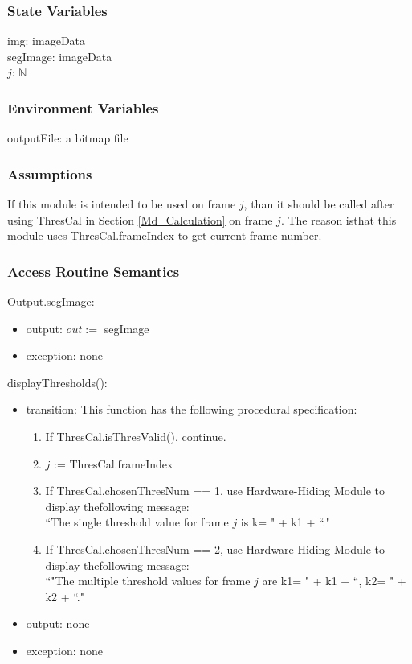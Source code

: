 \documentclass[12pt, titlepage]{article}
\begin{document}
\subsubsection{State Variables}

img: imageData\\
segImage: imageData\\
$j$: $\mathbb{N}$

\subsubsection{Environment Variables}

outputFile: a bitmap file

\subsubsection{Assumptions}

If this module is intended to be used on frame $j$, than it should be called
after using ThresCal in Section \ref{Md_Calculation} on frame $j$. The reason
isthat this module uses ThresCal.frameIndex to get current frame number.

\subsubsection{Access Routine Semantics}

\noindent Output.segImage:
\begin{itemize}
\item output: $out :=$ segImage
\item exception: none 
\end{itemize}

\noindent displayThresholds():
\begin{itemize}
\item transition:
This function has the following procedural specification:
\begin{enumerate}
\item If ThresCal.isThresValid(), continue.
\item $j$ := ThresCal.frameIndex
\item If ThresCal.chosenThresNum == 1, use Hardware-Hiding Module to display
thefollowing message:\\
``The single threshold value for frame $j$ is k= " + k1 + ``."
\item If ThresCal.chosenThresNum == 2, use Hardware-Hiding Module to display
thefollowing message:\\
``"The multiple threshold values for frame $j$ are k1= " + k1 +
``, k2= " + k2 + ``."
\end{enumerate}
\item output: none
\item exception: none
\end{itemize}
\end{document}
